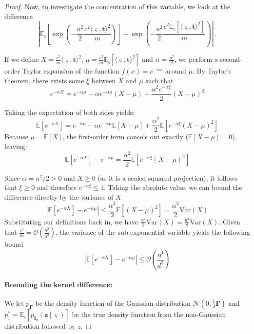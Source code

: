 \begin{proof}
    Now, to investigate the concentration of this variable, we look at the difference
    \[
        \left| \mathbb E_{\bm \varsigma}\left[ \exp\left(- \frac{u^2}{2}\frac{c^2\langle \bm \varsigma, \bm t\rangle^2}{m}\right) \right] -  \exp\left(- \frac{u^2}{2}\frac{c^2\mathbb E_{\bm \varsigma}[\langle \bm \varsigma, \bm t\rangle^2]}{m}\right)\right|\, .
    \]
    
    If we define $X = \frac{c^2}{m}\langle \bm \varsigma, \bm t\rangle^2$, $\mu = \frac{c^2}{m}\mathbb E_{\bm \varsigma}[\langle \bm \varsigma, \bm t\rangle^2]$ and $\alpha = \frac{u^2}{2}$, we perform a second-order Taylor expansion of the function $f(x) = e^{-\alpha x}$ around $\mu$. By Taylor's theorem, there exists some $\xi$ between $X$ and $\mu$ such that
    \[
        e^{-\alpha X} = e^{-\alpha \mu} - \alpha e^{-\alpha \mu}(X - \mu) + \frac{\alpha^2 e^{-\alpha \xi}}{2}(X - \mu)^2
    \]

    Taking the expectation of both sides yields:$$\mathbb{E}[e^{-\alpha X}] = e^{-\alpha \mu} - \alpha e^{-\alpha \mu}\mathbb{E}[X - \mu] + \frac{\alpha^2}{2}\mathbb{E}[e^{-\alpha \xi}(X - \mu)^2]$$Because $\mu = \mathbb{E}[X]$, the first-order term cancels out exactly ($\mathbb{E}[X - \mu] = 0$), leaving:$$\mathbb{E}[e^{-\alpha X}] - e^{-\alpha \mu} = \frac{\alpha^2}{2}\mathbb{E}[e^{-\alpha \xi}(X - \mu)^2]$$

    Since $\alpha = u^2/2 > 0$ and $X \geq 0$ (as it is a scaled squared projection), it follows that $\xi \geq 0$ and therefore $e^{-\alpha \xi} \leq 1$. Taking the absolute value, we can bound the difference directly by the variance of $X$
    \[
        |\mathbb{E}[e^{-\alpha X}] - e^{-\alpha \mu}| \leq \frac{\alpha^2}{2}\mathbb{E}[(X - \mu)^2] = \frac{\alpha^2}{2}\text{Var}(X)
    \]
    Substituting our definitions back in, we have $\frac{\alpha^2}{2}\text{Var}(X) = \frac{u^4}{8}\text{Var}(X)$. Given that $\frac{c^2}{m} = \mathcal{O}(\frac{\eta^2}{d^4})$, the variance of the sub-exponential variable yields the following bound
    \begin{equation}\label{eq:char-fn-bound}
        |\mathbb{E}[e^{-\alpha X}] - e^{-\alpha \mu}| \leq \mathcal{O}\left(\frac{\eta^4}{d^5}\right)
    \end{equation}
    
    \item \paragraph{Bounding the kernel difference:}
    We let $p_{\bm \Gamma}$ be the density function of the Gaussian distribution $\mathcal N(0, \frac{1}{d}\bm \Gamma)$ and $p_1^* = \mathbb E_{\bm \varsigma}[p_{\bm I_d}(\bm z \ | \ \bm \varsigma)]$ be the true density function from the non-Gaussian distribution followed by $z$.
    

\end{proof}
